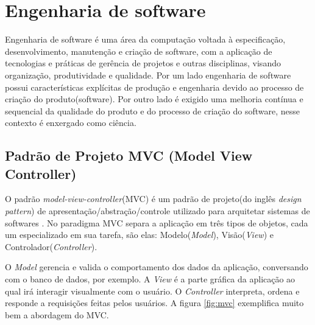 
\section{Engenharia de software}

Engenharia de software é uma área da computação voltada à especificação, desenvolvimento, manutenção e criação de software, com a  aplicação de tecnologias e práticas de gerência de projetos e outras disciplinas, visando organização, produtividade e qualidade\cite{engenhariawikipedia}. Por um lado engenharia de software possui características explícitas de produção e engenharia devido ao processo de criação do produto(software). Por outro lado é exigido uma melhoria contínua e sequencial da qualidade do produto e do processo de criação do software, nesse contexto é enxergado como ciência\cite{travassos2002introducao}.



\subsection{Padrão de Projeto MVC (Model View Controller)}
\label{subsec:thresholding}

O padrão \textit{model-view-controller}(MVC) é um padrão de projeto(do inglês \textit{design pattern}) de apresentação/abstração/controle utilizado para arquitetar sistemas de softwares \cite{leff2001webmvc}. No paradigma MVC separa a aplicação em três tipos de objetos, cada um especializado em sua tarefa, são elas: Modelo(\textit{Model}), Visão(\textit{View}) e Controlador(\textit{Controller}). \par
O \textit{Model} gerencia e valida o comportamento dos dados da aplicação, conversando com o banco de dados, por exemplo. A \textit{View} é a parte gráfica da aplicação ao qual irá interagir visualmente com o usuário. O \textit{Controller} interpreta, ordena e responde a requisições feitas pelos usuários.\cite{burbeck1997applications} A figura \ref{fig:mvc} exemplifica muito bem a abordagem do MVC. \par

